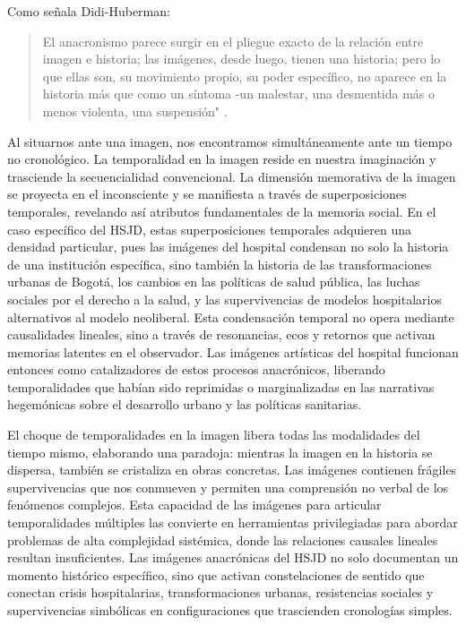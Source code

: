 Como señala Didi-Huberman: 

\begin{quote}
    El anacronismo parece surgir en el pliegue exacto de la relación entre imagen e historia; las imágenes, desde luego, tienen una historia; pero lo que ellas son, su movimiento propio, su poder específico, no aparece en la historia más que como un síntoma -un malestar, una desmentida más o menos violenta, una suspensión" \parencite[p. 48]{DidiHuberman2011}.
\end{quote}

Al situarnos ante una imagen, nos encontramos simultáneamente ante un tiempo no cronológico. La temporalidad en la imagen reside en nuestra imaginación y trasciende la secuencialidad convencional. La dimensión memorativa de la imagen se proyecta en el inconsciente y se manifiesta a través de superposiciones temporales, revelando así atributos fundamentales de la memoria social. En el caso específico del HSJD, estas superposiciones temporales adquieren una densidad particular, pues las imágenes del hospital condensan no solo la historia de una institución específica, sino también la historia de las transformaciones urbanas de Bogotá, los cambios en las políticas de salud pública, las luchas sociales por el derecho a la salud, y las supervivencias de modelos hospitalarios alternativos al modelo neoliberal. Esta condensación temporal no opera mediante causalidades lineales, sino a través de resonancias, ecos y retornos que activan memorias latentes en el observador. Las imágenes artísticas del hospital funcionan entonces como catalizadores de estos procesos anacrónicos, liberando temporalidades que habían sido reprimidas o marginalizadas en las narrativas hegemónicas sobre el desarrollo urbano y las políticas sanitarias.

El choque de temporalidades en la imagen libera todas las modalidades del tiempo mismo, elaborando una paradoja: mientras la imagen en la historia se dispersa, también se cristaliza en obras concretas. Las imágenes contienen frágiles supervivencias que nos conmueven y permiten una comprensión no verbal de los fenómenos complejos. Esta capacidad de las imágenes para articular temporalidades múltiples las convierte en herramientas privilegiadas para abordar problemas de alta complejidad sistémica, donde las relaciones causales lineales resultan insuficientes. Las imágenes anacrónicas del HSJD no solo documentan un momento histórico específico, sino que activan constelaciones de sentido que conectan crisis hospitalarias, transformaciones urbanas, resistencias sociales y supervivencias simbólicas en configuraciones que trascienden cronologías simples.

